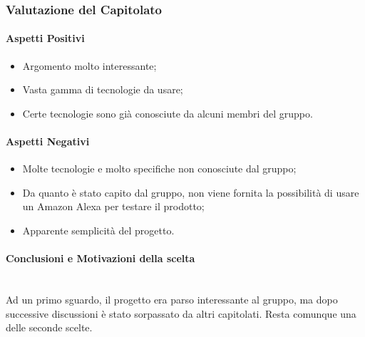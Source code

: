 \subsubsection{Valutazione del Capitolato}
\paragraph{Aspetti Positivi}
\begin{itemize}
	\item Argomento molto interessante;
	\item Vasta gamma di tecnologie da usare;
	\item Certe tecnologie sono già conosciute da alcuni membri del gruppo.
\end{itemize}

\paragraph{Aspetti Negativi}
\begin{itemize}
	\item Molte tecnologie e molto specifiche non conosciute dal gruppo;
	\item Da quanto è stato capito dal gruppo, non viene fornita la possibilità di usare un Amazon Alexa per testare il prodotto;
	\item Apparente semplicità del progetto.
\end{itemize}

\paragraph{Conclusioni e Motivazioni della scelta} ~\\
Ad un primo sguardo, il progetto era parso interessante al gruppo, ma dopo successive discussioni è stato sorpassato da altri capitolati. Resta comunque una delle seconde scelte.
